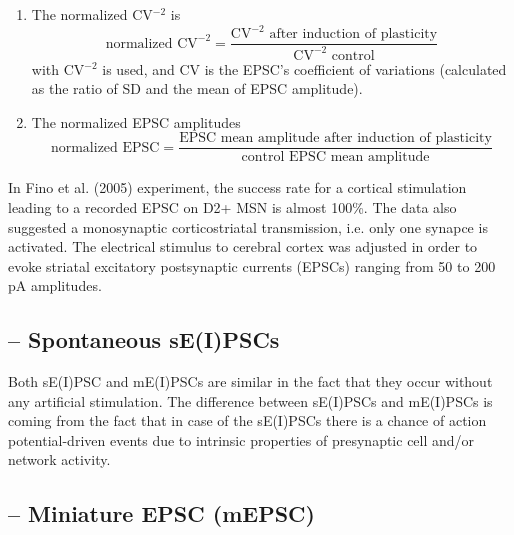 \begin{enumerate}
  \item The normalized CV$^{-2}$ is
\begin{equation}
\text{normalized CV}^{-2} = \frac{\text{CV}^{-2}\text{ after induction of
plasticity}}{\text{CV}^{-2}\text{ control}}
\end{equation}
with CV$^{-2}$ is used, and
CV is the EPSC's coefficient of variations (calculated as the ratio of SD and
the mean of EPSC amplitude).

  \item The normalized EPSC amplitudes
\begin{equation}
\text{normalized EPSC} = \frac{\text{EPSC mean amplitude after induction of
plasticity}}{\text{control EPSC mean amplitude}}
\end{equation}
\end{enumerate} 

In Fino et al. (2005) experiment, the success rate for a cortical stimulation
leading to a recorded EPSC on D2+ MSN is almost 100\%. The data also suggested a
monosynaptic corticostriatal transmission, i.e. only one synapce is activated.
The electrical stimulus to cerebral cortex was adjusted in order to evoke
striatal excitatory postsynaptic currents (EPSCs) ranging from 50 to 200 pA
amplitudes.

\subsection{-- Spontaneous sE(I)PSCs}

Both sE(I)PSC and mE(I)PSCs are similar in the fact that they occur without any
artificial stimulation.
The difference between sE(I)PSCs and mE(I)PSCs is coming from the fact that in
case of the sE(I)PSCs there is a chance of action potential-driven events due to
intrinsic properties of presynaptic cell and/or network activity.



\subsection{-- Miniature EPSC (mEPSC)}
\label{sec:mEPSC}

